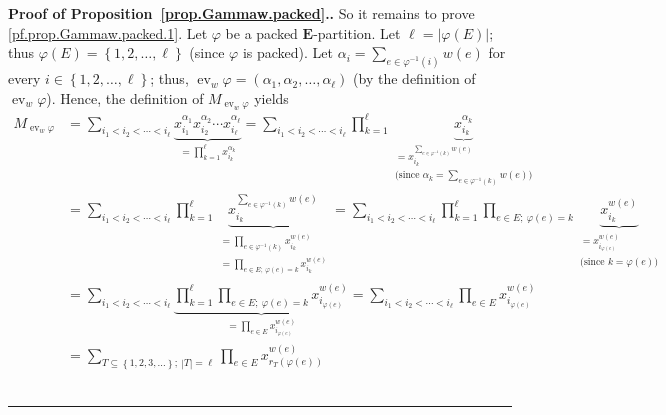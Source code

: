 \documentclass[numbers=enddot,12pt,final,onecolumn,notitlepage,abstracton]{scrartcl}%
\theoremstyle{definition}
\newenvironment{proof}[1][Proof]{\noindent\textbf{#1.} }{\ \rule{0.5em}{0.5em}}
\let\sumnonlimits\sum
\let\prodnonlimits\prod
\renewcommand{\sum}{\sumnonlimits\limits}
\renewcommand{\prod}{\prodnonlimits\limits}
\newcommand{\ev}{\operatorname{ev}}
\newcommand{\EE}{{\mathbf{E}}}
\begin{document}
\begin{proof}[Proof of Proposition~\ref{prop.Gammaw.packed}.]
So it remains to prove \eqref{pf.prop.Gammaw.packed.1}. Let $\varphi$
be a packed $\EE$-partition. Let
$\ell = \left|\varphi\left(E\right)\right|$; thus
$\varphi\left(E\right) = \left\{1, 2, \ldots, \ell\right\}$
(since $\varphi$ is packed).
Let $\alpha_i = \sum_{e \in \varphi^{-1}\left(i\right)}
w\left(e\right)$ for every $i \in \left\{ 1, 2, \ldots, \ell \right\}$;
thus,
$\ev_w \varphi = \left(\alpha_1, \alpha_2, \ldots, \alpha_\ell\right)$
(by the definition of $\ev_w \varphi$).
Hence, the definition of $M_{\ev_w \varphi}$ yields
\begin{align}
M_{\ev_w \varphi}
&= \sum_{i_1 < i_2 < \cdots < i_\ell}
\underbrace{x_{i_1}^{\alpha_1} x_{i_2}^{\alpha_2} \cdots x_{i_\ell}^{\alpha_\ell}}
_{= \prod_{k = 1}^\ell x_{i_k}^{\alpha_k}}
= \sum_{i_1 < i_2 < \cdots < i_\ell}
\prod_{k = 1}^\ell \underbrace{x_{i_k}^{\alpha_k}}
                              _{\substack{= x_{i_k}^{\sum_{e \in \varphi^{-1}\left(k\right)}
                                w\left(e\right)} \\
                                \text{(since } \alpha_k = \sum_{e \in \varphi^{-1}\left(k\right)}
                                w\left(e\right) \text{)}}}
\nonumber \\
&= \sum_{i_1 < i_2 < \cdots < i_\ell}
\prod_{k = 1}^\ell \underbrace{x_{i_k}^{\sum_{e \in \varphi^{-1}\left(k\right)}
                                w\left(e\right)}}
                              _{\substack{= \prod_{e \in \varphi^{-1}\left(k\right)}
                                x_{i_k}^{w\left(e\right)} \\
                                = \prod_{e \in E;\ \varphi\left(e\right) = k}
                                x_{i_k}^{w\left(e\right)} }}
= \sum_{i_1 < i_2 < \cdots < i_\ell}
\prod_{k = 1}^\ell \prod_{e \in E;\ \varphi\left(e\right) = k}
\underbrace{x_{i_k}^{w\left(e\right)}}_{\substack{
         =x_{i_{\varphi\left(e\right)}}^{w\left(e\right)} \\
         \text{(since } k = \varphi\left(e\right) \text{)}
         }}
\nonumber \\
&= \sum_{i_1 < i_2 < \cdots < i_\ell}
\underbrace{\prod_{k = 1}^\ell \prod_{e \in E;\ \varphi\left(e\right) = k}
x_{i_{\varphi\left(e\right)}}^{w\left(e\right)}}
_{ = \prod_{e \in E} x_{i_{\varphi\left(e\right)}}^{w\left(e\right)}}
= \sum_{i_1 < i_2 < \cdots < i_\ell}
\prod_{e \in E} x_{i_{\varphi\left(e\right)}}^{w\left(e\right)}
\nonumber \\
&= \sum_{T \subseteq \left\{1, 2, 3, \ldots\right\} ; \ \left|T\right| = \ell}
\prod_{e \in E} x_{r_T\left(\varphi\left(e\right)\right)}^{w\left(e\right)}

\end{align}
\end{proof}
\end{document}
